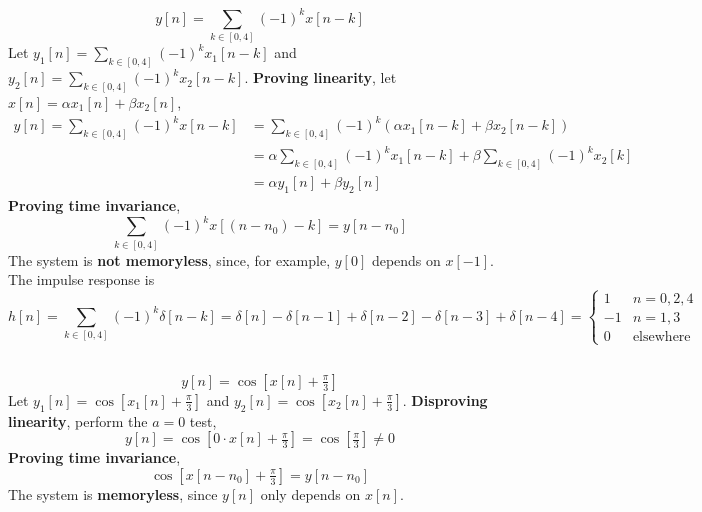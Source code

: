 \documentclass{article}
\begin{document}
\subsection{}

\begin{equation}
    y[n] = \sum_{k \in [0, 4]} (-1)^k x[n - k]
\end{equation}
Let \(y_1[n] = \sum_{k \in [0, 4]} (-1)^k x_1[n - k]\) and \(y_2[n] = \sum_{k \in [0, 4]} (-1)^k x_2[n - k]\).
\textbf{Proving linearity}, let \(x[n] = \alpha x_1[n] + \beta x_2[n]\),
\begin{align}
    y[n] = \sum_{k \in [0, 4]} (-1)^k x[n - k] &= \sum_{k \in [0, 4]} (-1)^k \left(\alpha x_1[n - k] + \beta x_2[n - k]\right) \\
    &= \alpha \sum_{k \in [0, 4]} (-1)^k x_1[n - k] + \beta \sum_{k \in [0, 4]} (-1)^k x_2[k] \\
    &= \alpha y_1[n] + \beta y_2[n]
\end{align}
\textbf{Proving time invariance},
\begin{equation}
    \sum_{k \in [0, 4]} (-1)^k x[(n - n_0) - k] = y[n - n_0]
\end{equation}
The system is \textbf{not memoryless}, since, for example, \(y[0]\) depends on \(x[-1]\).
The impulse response is
\begin{equation}
    h[n] = \sum_{k \in [0, 4]} (-1)^k \delta [n - k] = \delta[n] - \delta[n - 1] + \delta[n - 2] - \delta[n - 3] + \delta[n - 4] =
    \begin{cases}
        1 & n = 0, 2, 4 \\
        -1 & n = 1, 3 \\
        0 & \text{elsewhere}
    \end{cases}
\end{equation}

\subsection{}

\begin{equation}
    y[n] = \cos[x[n] + \tfrac{\pi}{3}]
\end{equation}
Let \(y_1[n] = \cos[x_1[n] + \tfrac{\pi}{3}]\) and \(y_2[n] = \cos[x_2[n] + \tfrac{\pi}{3}]\).
\textbf{Disproving linearity}, perform the \(a = 0\) test,
\begin{equation}
    y[n] = \cos[0 \cdot x[n] + \tfrac{\pi}{3}] = \cos[\tfrac{\pi}{3}] \neq 0
\end{equation}
\textbf{Proving time invariance},
\begin{equation}
    \cos[x[n - n_0] + \tfrac{\pi}{3}] = y[n - n_0]
\end{equation}
The system is \textbf{memoryless}, since \(y[n]\) only depends on \(x[n]\).
\end{document}
